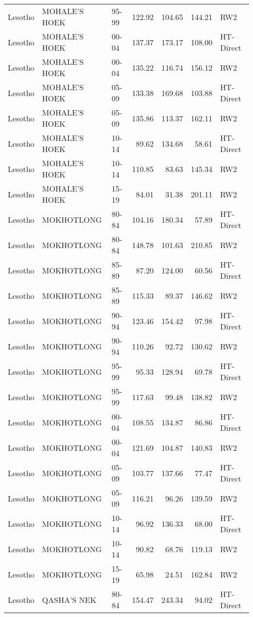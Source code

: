 \begin{longtable}{lllrrrl}
  Lesotho & MOHALE'S HOEK & 95-99 & 122.92 & 104.65 & 144.21 & RW2 \\ 
  Lesotho & MOHALE'S HOEK & 00-04 & 137.37 & 173.17 & 108.00 & HT-Direct \\ 
  Lesotho & MOHALE'S HOEK & 00-04 & 135.22 & 116.74 & 156.12 & RW2 \\ 
  Lesotho & MOHALE'S HOEK & 05-09 & 133.38 & 169.68 & 103.88 & HT-Direct \\ 
  Lesotho & MOHALE'S HOEK & 05-09 & 135.86 & 113.37 & 162.11 & RW2 \\ 
  Lesotho & MOHALE'S HOEK & 10-14 & 89.62 & 134.68 & 58.61 & HT-Direct \\ 
  Lesotho & MOHALE'S HOEK & 10-14 & 110.85 & 83.63 & 145.34 & RW2 \\ 
  Lesotho & MOHALE'S HOEK & 15-19 & 84.01 & 31.38 & 201.11 & RW2 \\ 
  Lesotho & MOKHOTLONG & 80-84 & 104.16 & 180.34 & 57.89 & HT-Direct \\ 
  Lesotho & MOKHOTLONG & 80-84 & 148.78 & 101.63 & 210.85 & RW2 \\ 
  Lesotho & MOKHOTLONG & 85-89 & 87.20 & 124.00 & 60.56 & HT-Direct \\ 
  Lesotho & MOKHOTLONG & 85-89 & 115.33 & 89.37 & 146.62 & RW2 \\ 
  Lesotho & MOKHOTLONG & 90-94 & 123.46 & 154.42 & 97.98 & HT-Direct \\ 
  Lesotho & MOKHOTLONG & 90-94 & 110.26 & 92.72 & 130.62 & RW2 \\ 
  Lesotho & MOKHOTLONG & 95-99 & 95.33 & 128.94 & 69.78 & HT-Direct \\ 
  Lesotho & MOKHOTLONG & 95-99 & 117.63 & 99.48 & 138.82 & RW2 \\ 
  Lesotho & MOKHOTLONG & 00-04 & 108.55 & 134.87 & 86.86 & HT-Direct \\ 
  Lesotho & MOKHOTLONG & 00-04 & 121.69 & 104.87 & 140.83 & RW2 \\ 
  Lesotho & MOKHOTLONG & 05-09 & 103.77 & 137.66 & 77.47 & HT-Direct \\ 
  Lesotho & MOKHOTLONG & 05-09 & 116.21 & 96.26 & 139.59 & RW2 \\ 
  Lesotho & MOKHOTLONG & 10-14 & 96.92 & 136.33 & 68.00 & HT-Direct \\ 
  Lesotho & MOKHOTLONG & 10-14 & 90.82 & 68.76 & 119.13 & RW2 \\ 
  Lesotho & MOKHOTLONG & 15-19 & 65.98 & 24.51 & 162.84 & RW2 \\ 
  Lesotho & QASHA'S NEK & 80-84 & 154.47 & 243.34 & 94.02 & HT-Direct \\ 

\end{longtable}
